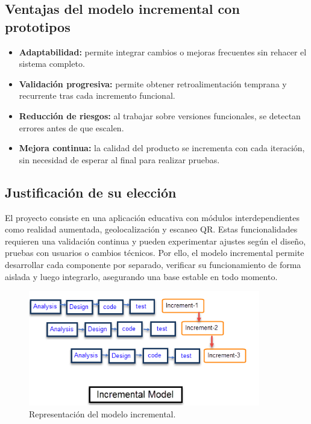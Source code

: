 \subsection*{Ventajas del modelo incremental con prototipos}
\begin{itemize}
    \item \textbf{Adaptabilidad:} permite integrar cambios o mejoras frecuentes sin rehacer el sistema completo.
    \item \textbf{Validación progresiva:} permite obtener retroalimentación temprana y recurrente tras cada incremento funcional.
    \item \textbf{Reducción de riesgos:} al trabajar sobre versiones funcionales, se detectan errores antes de que escalen.
    \item \textbf{Mejora continua:} la calidad del producto se incrementa con cada iteración, sin necesidad de esperar al final para realizar pruebas.
\end{itemize}

\subsection*{Justificación de su elección}
El proyecto consiste en una aplicación educativa con módulos interdependientes como realidad aumentada, geolocalización y escaneo QR. Estas funcionalidades requieren una validación continua y pueden experimentar ajustes según el diseño, pruebas con usuarios o cambios técnicos. Por ello, el modelo incremental permite desarrollar cada componente por separado, verificar su funcionamiento de forma aislada y luego integrarlo, asegurando una base estable en todo momento.

\begin{figure}[H]
    \centering
    \includegraphics[width=0.9\textwidth]{figs/modelo_incremental.png}
    \caption{Representación del modelo incremental.}
    \label{fig:modelo-incremental}
\end{figure}

